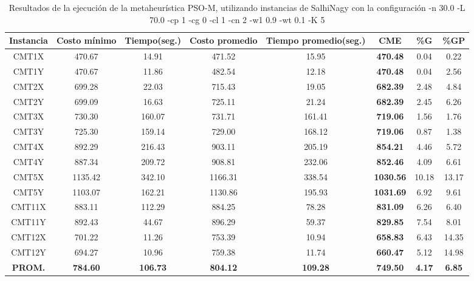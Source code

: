 \begin{table}[h]
\caption{Resultados de la ejecución de la metaheurística PSO-M, utilizando instancias de SalhiNagy con la configuración -n 30.0 -L 70.0 -cp 1 -cg 0 -cl 1 -cn 2 -w1 0.9 -wt 0.1 -K 5}
\centering
\small
\begin{tabular}{c c c c c c c c}
\hline\hline
Instancia & Costo mínimo & Tiempo(seg.) & Costo promedio & Tiempo promedio(seg.) & CME & \%G & \%GP \\ [0.5ex]
\hline
CMT1X & 470.67 & 14.91 & 
471.52 & 15.95 & \bf{470.48} & 
0.04 & 0.22\\CMT1Y & 470.67 & 11.86 & 
482.54 & 12.18 & \bf{470.48} & 
0.04 & 2.56\\CMT2X & 699.28 & 22.03 & 
715.43 & 19.05 & \bf{682.39} & 
2.48 & 4.84\\CMT2Y & 699.09 & 16.63 & 
725.11 & 21.24 & \bf{682.39} & 
2.45 & 6.26\\CMT3X & 730.30 & 160.07 & 
731.71 & 161.41 & \bf{719.06} & 
1.56 & 1.76\\CMT3Y & 725.30 & 159.14 & 
729.00 & 168.12 & \bf{719.06} & 
0.87 & 1.38\\CMT4X & 892.29 & 216.43 & 
903.11 & 205.19 & \bf{854.21} & 
4.46 & 5.72\\CMT4Y & 887.34 & 209.72 & 
908.81 & 232.06 & \bf{852.46} & 
4.09 & 6.61\\CMT5X & 1135.42 & 342.10 & 
1166.31 & 338.54 & \bf{1030.56} & 
10.18 & 13.17\\CMT5Y & 1103.07 & 162.21 & 
1130.86 & 195.93 & \bf{1031.69} & 
6.92 & 9.61\\CMT11X & 883.11 & 112.29 & 
884.25 & 78.28 & \bf{831.09} & 
6.26 & 6.40\\CMT11Y & 892.43 & 44.67 & 
896.29 & 59.37 & \bf{829.85} & 
7.54 & 8.01\\CMT12X & 701.22 & 11.26 & 
753.39 & 10.94 & \bf{658.83} & 
6.43 & 14.35\\CMT12Y & 694.27 & 10.96 & 
759.38 & 11.74 & \bf{660.47} & 
5.12 & 14.98\\\bf{PROM.} & 
\bf{784.60} & \bf{106.73} & \bf{804.12} & \bf{109.28} & \bf{749.50} & \bf{4.17} & \bf{6.85}\\[1ex]\hline
\end{tabular}
\label{table:nonlin}
\end{table}
